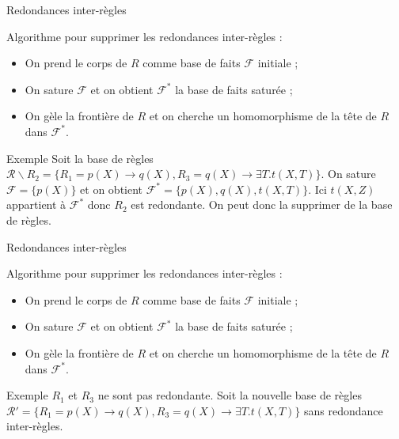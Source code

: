 \begin{frame}{Redondances inter-règles}
   
  Algorithme pour supprimer les redondances inter-règles :
    
    \begin{itemize}
       \item On prend le corps de $R$ comme base de faits $\mathcal{F}$ initiale ;

        \item On sature $\mathcal{F}$ et on obtient $\mathcal{F}^*$ la base de faits saturée ;
        
               
        \color{red}
        \item On gèle la frontière de $R$ et on cherche un homomorphisme de la tête de $R$ dans
        $\mathcal{F}^*$.
        \color{black}  
    \end{itemize}
    
    \begin{block}{Exemple}
          Soit la base de règles $\mathcal{R} \backslash R_2 = \{ R_1 = p(X) \xrightarrow{} q(X), R_3 = q(X) \xrightarrow{} \exists T.t(X,T)\}$. On sature $\mathcal{F} = \{p(X)\}$ et on obtient $\mathcal{F}^* = \{p(X), q(X), t(X,T)\}$. Ici $t(X,Z)$ appartient à $\mathcal{F}^*$ donc $R_2$ est redondante. On peut donc la supprimer de la base de règles.
    \end{block}
    
\end{frame}


\begin{frame}{Redondances inter-règles}
   
  Algorithme pour supprimer les redondances inter-règles :
    
    \begin{itemize}
          \item On prend le corps de $R$ comme base de faits $\mathcal{F}$ initiale ;

        \item On sature $\mathcal{F}$ et on obtient $\mathcal{F}^*$ la base de faits saturée ;
        
  
        \item On gèle la frontière de $R$ et on cherche un homomorphisme de la tête de $R$ dans $\mathcal{F}^*$.
    
   
    \end{itemize}
    
    \begin{block}{Exemple}
    $R_1$ et $R_3$ ne sont pas redondante. 
        Soit la nouvelle base de règles $\mathcal{R}' = \{ R_1 = p(X) \xrightarrow{} q(X), R_3 = q(X) \xrightarrow{} \exists T.t(X,T)\}$ sans redondance inter-règles.
    \end{block}
    
\end{frame}

